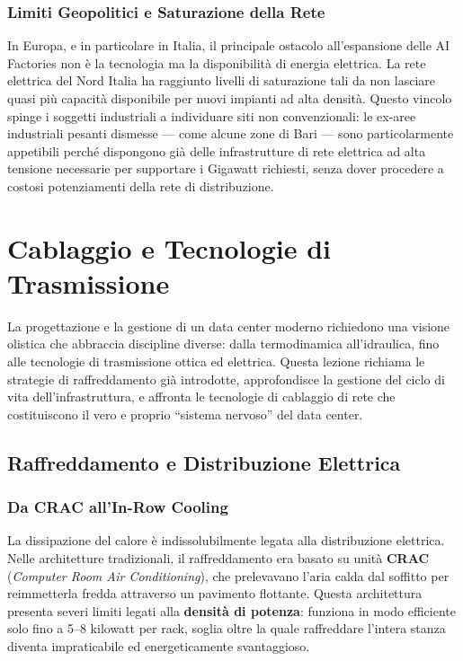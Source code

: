 \documentclass[
  italian,
  openany]{book}
\begin{document}
\subsection{Limiti Geopolitici e Saturazione della
Rete}\label{limiti-geopolitici-e-saturazione-della-rete}

In Europa, e in particolare in Italia, il principale ostacolo
all'espansione delle AI Factories non è la tecnologia ma la
disponibilità di energia elettrica. La rete elettrica del Nord Italia ha
raggiunto livelli di saturazione tali da non lasciare quasi più capacità
disponibile per nuovi impianti ad alta densità. Questo vincolo spinge i
soggetti industriali a individuare siti non convenzionali: le ex-aree
industriali pesanti dismesse --- come alcune zone di Bari --- sono
particolarmente appetibili perché dispongono già delle infrastrutture di
rete elettrica ad alta tensione necessarie per supportare i Gigawatt
richiesti, senza dover procedere a costosi potenziamenti della rete di
distribuzione.

\newpage

\chapter{Cablaggio e Tecnologie di
Trasmissione}\label{cablaggio-e-tecnologie-di-trasmissione}

La progettazione e la gestione di un data center moderno richiedono una
visione olistica che abbraccia discipline diverse: dalla termodinamica
all'idraulica, fino alle tecnologie di trasmissione ottica ed elettrica.
Questa lezione richiama le strategie di raffreddamento già introdotte,
approfondisce la gestione del ciclo di vita dell'infrastruttura, e
affronta le tecnologie di cablaggio di rete che costituiscono il vero e
proprio ``sistema nervoso'' del data center.

\section{Raffreddamento e Distribuzione
Elettrica}\label{raffreddamento-e-distribuzione-elettrica}

\subsection{Da CRAC all'In-Row Cooling}\label{da-crac-allin-row-cooling}

La dissipazione del calore è indissolubilmente legata alla distribuzione
elettrica. Nelle architetture tradizionali, il raffreddamento era basato
su unità \textbf{CRAC} (\emph{Computer Room Air Conditioning}), che
prelevavano l'aria calda dal soffitto per reimmetterla fredda attraverso
un pavimento flottante. Questa architettura presenta severi limiti
legati alla \textbf{densità di potenza}: funziona in modo efficiente
solo fino a 5--8 kilowatt per rack, soglia oltre la quale raffreddare
l'intera stanza diventa impraticabile ed energeticamente svantaggioso.
\end{document}
